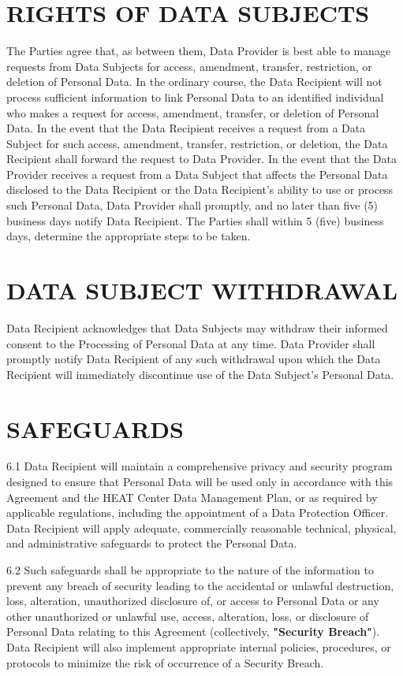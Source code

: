 {\begin{enumerate}
\section{RIGHTS OF DATA SUBJECTS}

The Parties agree that, as between them, Data Provider is best able to manage requests from Data Subjects for access, amendment, transfer, restriction, or deletion of Personal Data. In the ordinary course, the Data Recipient will not process sufficient information to link Personal Data to an identified individual who makes a request for access, amendment, transfer, or deletion of Personal Data. In the event that the Data Recipient receives a request from a Data Subject for such access, amendment, transfer, restriction, or deletion, the Data Recipient shall forward the request to Data Provider. In the event that the Data Provider receives a request from a Data Subject that affects the Personal Data disclosed to the Data Recipient or the Data Recipient's ability to use or process such Personal Data, Data Provider shall promptly, and no later than five (5) business days notify Data Recipient. The Parties shall within 5 (five) business days, determine the appropriate steps to be taken.

\section{DATA SUBJECT WITHDRAWAL}

Data Recipient acknowledges that Data Subjects may withdraw their informed consent to the Processing of Personal Data at any time. Data Provider shall promptly notify Data Recipient of any such withdrawal upon which the Data Recipient will immediately discontinue use of the Data Subject's Personal Data.

\section{SAFEGUARDS}

6.1 Data Recipient will maintain a comprehensive privacy and security program designed to ensure that Personal Data will be used only in accordance with this Agreement and the HEAT Center Data Management Plan, or as required by applicable regulations, including the appointment of a Data Protection Officer. Data Recipient will apply adequate, commercially reasonable technical, physical, and administrative safeguards to protect the Personal Data.

6.2 Such safeguards shall be appropriate to the nature of the information to prevent any breach of security leading to the accidental or unlawful destruction, loss, alteration, unauthorized disclosure of, or access to Personal Data or any other unauthorized or unlawful use, access, alteration, loss, or disclosure of Personal Data relating to this Agreement (collectively, \textbf{"Security Breach"}). Data Recipient will also implement appropriate internal policies, procedures, or protocols to minimize the risk of occurrence of a Security Breach.


\end{enumerate}}
